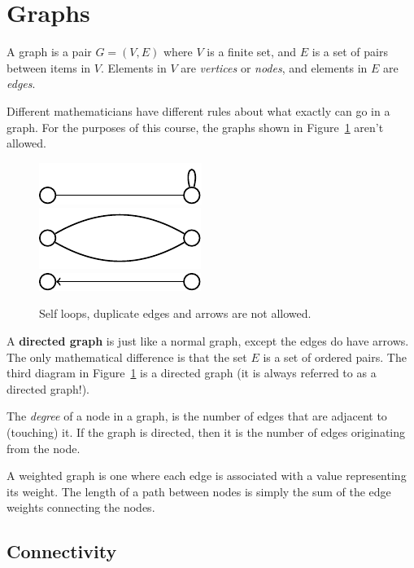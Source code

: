 
\section{Graphs}

A graph is a pair $G = (V,E)$ where $V$ is a finite set, and $E$ is a set of
pairs between items in $V$. Elements in $V$ are \textit{vertices} or
\textit{nodes}, and elements in $E$ are \textit{edges}.

Different mathematicians have different rules about what exactly can go in a
graph. For the purposes of this course, the graphs shown in
Figure~\ref{fig:bad-graphs} aren't allowed.

\begin{figure}[h]
  \centering
  \includegraphics{diagrams/self-loops}\\
  \includegraphics{diagrams/multiple-edges}\\
  \includegraphics{diagrams/directed-graph}
  \caption{Self loops, duplicate edges and arrows are not allowed.}
  \label{fig:bad-graphs}
\end{figure}

A \textbf{directed graph} is just like a normal graph, except the edges do have
arrows. The only mathematical difference is that the set $E$ is a set of ordered
pairs. The third diagram in Figure~\ref{fig:bad-graphs} is a directed graph (it
is always referred to as a directed graph!).

The \textit{degree} of a node in a graph, is the number of edges that are
adjacent to (touching) it. If the graph is directed, then it is the number of
edges originating from the node.

A weighted graph is one where each edge is associated with a value representing
its weight. The length of a path between nodes is simply the sum of the edge
weights connecting the nodes.

\subsection{Connectivity}
\label{connectivity}

